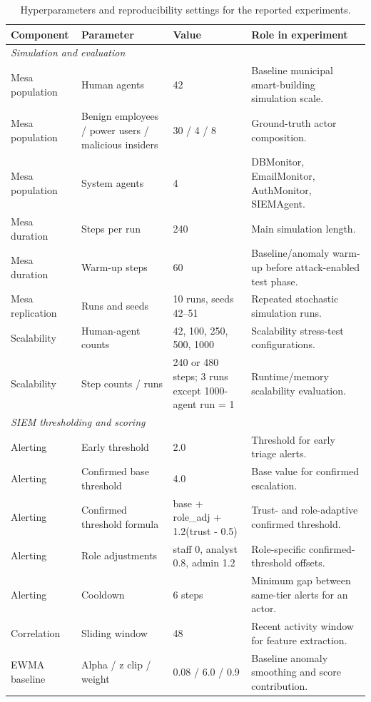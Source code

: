 \begin{table}[t]
\centering
\caption{Hyperparameters and reproducibility settings for the reported experiments.}
\label{tab:hyperparameters_reproducibility}
\small
\begin{tabular}{llll}
\toprule
Component & Parameter & Value & Role in experiment \\
\midrule
\multicolumn{4}{l}{\textit{Simulation and evaluation}} \\
Mesa population & Human agents & 42 & Baseline municipal smart-building simulation scale. \\
Mesa population & Benign employees / power users / malicious insiders & 30 / 4 / 8 & Ground-truth actor composition. \\
Mesa population & System agents & 4 & DBMonitor, EmailMonitor, AuthMonitor, SIEMAgent. \\
Mesa duration & Steps per run & 240 & Main simulation length. \\
Mesa duration & Warm-up steps & 60 & Baseline/anomaly warm-up before attack-enabled test phase. \\
Mesa replication & Runs and seeds & 10 runs, seeds 42--51 & Repeated stochastic simulation runs. \\
Scalability & Human-agent counts & 42, 100, 250, 500, 1000 & Scalability stress-test configurations. \\
Scalability & Step counts / runs & 240 or 480 steps; 3 runs except 1000-agent run = 1 & Runtime/memory scalability evaluation. \\
\midrule
\multicolumn{4}{l}{\textit{SIEM thresholding and scoring}} \\
Alerting & Early threshold & 2.0 & Threshold for early triage alerts. \\
Alerting & Confirmed base threshold & 4.0 & Base value for confirmed escalation. \\
Alerting & Confirmed threshold formula & base + role\_adj + 1.2(trust - 0.5) & Trust- and role-adaptive confirmed threshold. \\
Alerting & Role adjustments & staff 0, analyst 0.8, admin 1.2 & Role-specific confirmed-threshold offsets. \\
Alerting & Cooldown & 6 steps & Minimum gap between same-tier alerts for an actor. \\
Correlation & Sliding window & 48 & Recent activity window for feature extraction. \\
EWMA baseline & Alpha / z clip / weight & 0.08 / 6.0 / 0.9 & Baseline anomaly smoothing and score contribution. \\

\end{tabular}
\end{table}
